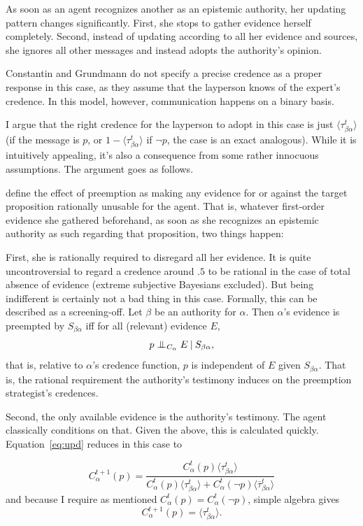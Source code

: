 \documentclass[11pt, a4paper]{scrartcl}
\newcommand{\given}[1][]{\:#1\vert\:}
\newcommand{\CI}{\mathrel{\perp\mspace{-10mu}\perp}}
\renewcommand{\a}{\alpha}
\begin{document}
As soon as an agent recognizes another as an epistemic authority, her updating pattern changes significantly. First, she stops to gather evidence herself completely. Second, instead of updating according to all her evidence and sources, she ignores all other messages and instead adopts the authority's opinion.

Constantin and Grundmann do not specify a precise credence as a proper response in this case, as they assume that the layperson knows of the expert's credence. In this model, however, communication happens on a binary basis.
 
I argue that the right credence for the layperson to adopt in this case is just $\langle \tau^t_{\beta\alpha} \rangle$ (if the message is $p$, or $1 - \langle \tau^t_{\beta\alpha} \rangle$ if $\neg p$, the case is an exact analogous). While it is intuitively appealing, it's also a consequence from some rather innocuous assumptions. The argument goes as follows. 

\textcite[p.12]{Constantin2017} define the effect of preemption as making any evidence for or against the target proposition rationally unusable for the agent. That is, whatever first-order evidence she gathered beforehand, as soon as she recognizes an epistemic authority as such regarding that proposition, two things happen: 

First, she is rationally required to disregard all her evidence. It is quite uncontroversial to regard a credence around $.5$ to be rational in the case of total absence of evidence (extreme subjective Bayesians excluded). But being indifferent is certainly not a bad thing in this case. Formally, this can be described as a screening-off. Let $\beta$ be an authority for $\alpha$. Then $\a$'s evidence is preempted by $S_{\beta\a}$ iff for all (relevant) evidence $E$, 
\[ 
    p \CI_{C_\a} E \given S_{\beta\a}, 
\]
that is, relative to $\a$'s credence function, $p$ is independent of $E$ given $S_{\beta\a}$. That is, the rational requirement the authority's testimony induces on the preemption strategist's credences.

Second, the only available evidence is the authority's testimony. The agent classically conditions on that. Given the above, this is calculated quickly. Equation~\ref{eq:upd} reduces in this case to 

\[
    C^{t+1}_\a (p) = \frac{C^t_\a(p) \langle \tau^t_{\beta\a} \rangle}
    {C^t_\a(p) \langle \tau^t_{\beta\a} \rangle + C^t_\a(\neg p) \langle \bar{\tau}^t_{\beta\a} \rangle}
\]
and because I require as mentioned $C^t_\a(p) = C^t_\a( \neg p)$, simple algebra gives 
\[
    C^{t+1}_\a (p) = \langle \tau^t_{\beta\a} \rangle.
\]
\end{document}
